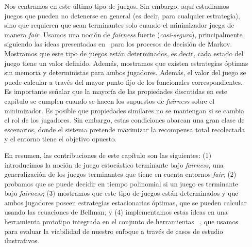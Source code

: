 Nos centramos en este último tipo de juegos. Sin embargo, aquí estudiamos juegos que pueden no detenerse en general (es decir, para cualquier estrategia), sino que requieren que sean terminantes solo cuando el minimizador juega de manera \textit{fair}.
Usamos una noción de \textit{fairness} fuerte (\emph{casi-segura}), principalmente siguiendo las ideas presentadas en~\cite{DBLP:journals/dc/BaierK98} para los procesos de decisión de Markov. Mostramos que este tipo de juegos están determinados, es decir, cada estado del juego tiene un valor definido. Además, mostramos que existen estrategias óptimas sin memoria y deterministas para ambos jugadores. Además, el valor del juego se puede calcular a través del mayor punto fijo de los funcionales correspondientes.
Es importante señalar que la mayoría de las propiedades discutidas en este capítulo se cumplen cuando se hacen los supuestos de \textit{fairness} sobre el minimizador. Es posible que propiedades similares no se mantengan si se cambia el rol de los jugadores.
Sin embargo, estas condiciones abarcan una gran clase de escenarios, donde el sistema pretende maximizar la recompensa total recolectada y el entorno tiene el objetivo opuesto.

En resumen, las contribuciones de este capítulo son las siguientes: (1) introducimos la noción de juego estocástico terminante bajo \textit{fairness}, una generalización de los juegos terminantes que tiene en cuenta entornos \textit{fair}; (2) probamos que se puede decidir en tiempo polinomial si un juego es terminante bajo \textit{fairness}; (3) mostramos que este tipo de juegos están determinados y que ambos jugadores poseen estrategias estacionarias óptimas, que se pueden calcular usando las ecuaciones de Bellman; y (4) implementamos estas ideas en una herramienta prototipo integrada en el conjunto de herramientas {\PrismGames}~\cite{DBLP:conf/cav/KwiatkowskaN0S20}, que usamos para evaluar la viabilidad de nuestro enfoque a través de casos de estudio ilustrativos.

